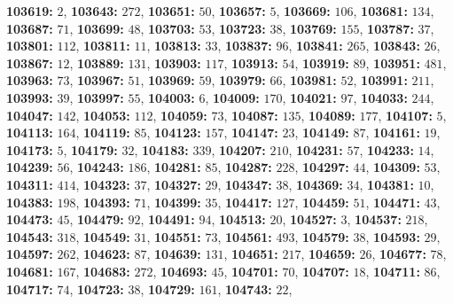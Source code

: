 \textsf{\bfseries 103619:} $2$, \textsf{\bfseries 103643:} $272$, \textsf{\bfseries 103651:} $50$, \textsf{\bfseries 103657:} $5$, \textsf{\bfseries 103669:} $106$, \textsf{\bfseries 103681:} $134$, \textsf{\bfseries 103687:} $71$, \textsf{\bfseries 103699:} $48$, \textsf{\bfseries 103703:} $53$, \textsf{\bfseries 103723:} $38$, \textsf{\bfseries 103769:} $155$, \textsf{\bfseries 103787:} $37$, \textsf{\bfseries 103801:} $112$, \textsf{\bfseries 103811:} $11$, \textsf{\bfseries 103813:} $33$, \textsf{\bfseries 103837:} $96$, \textsf{\bfseries 103841:} $265$, \textsf{\bfseries 103843:} $26$, \textsf{\bfseries 103867:} $12$, \textsf{\bfseries 103889:} $131$, \textsf{\bfseries 103903:} $117$, \textsf{\bfseries 103913:} $54$, \textsf{\bfseries 103919:} $89$, \textsf{\bfseries 103951:} $481$, \textsf{\bfseries 103963:} $73$, \textsf{\bfseries 103967:} $51$, \textsf{\bfseries 103969:} $59$, \textsf{\bfseries 103979:} $66$, \textsf{\bfseries 103981:} $52$, \textsf{\bfseries 103991:} $211$, \textsf{\bfseries 103993:} $39$, \textsf{\bfseries 103997:} $55$, \textsf{\bfseries 104003:} $6$, \textsf{\bfseries 104009:} $170$, \textsf{\bfseries 104021:} $97$, \textsf{\bfseries 104033:} $244$, \textsf{\bfseries 104047:} $142$, \textsf{\bfseries 104053:} $112$, \textsf{\bfseries 104059:} $73$, \textsf{\bfseries 104087:} $135$, \textsf{\bfseries 104089:} $177$, \textsf{\bfseries 104107:} $5$, \textsf{\bfseries 104113:} $164$, \textsf{\bfseries 104119:} $85$, \textsf{\bfseries 104123:} $157$, \textsf{\bfseries 104147:} $23$, \textsf{\bfseries 104149:} $87$, \textsf{\bfseries 104161:} $19$, \textsf{\bfseries 104173:} $5$, \textsf{\bfseries 104179:} $32$, \textsf{\bfseries 104183:} $339$, \textsf{\bfseries 104207:} $210$, \textsf{\bfseries 104231:} $57$, \textsf{\bfseries 104233:} $14$, \textsf{\bfseries 104239:} $56$, \textsf{\bfseries 104243:} $186$, \textsf{\bfseries 104281:} $85$, \textsf{\bfseries 104287:} $228$, \textsf{\bfseries 104297:} $44$, \textsf{\bfseries 104309:} $53$, \textsf{\bfseries 104311:} $414$, \textsf{\bfseries 104323:} $37$, \textsf{\bfseries 104327:} $29$, \textsf{\bfseries 104347:} $38$, \textsf{\bfseries 104369:} $34$, \textsf{\bfseries 104381:} $10$, \textsf{\bfseries 104383:} $198$, \textsf{\bfseries 104393:} $71$, \textsf{\bfseries 104399:} $35$, \textsf{\bfseries 104417:} $127$, \textsf{\bfseries 104459:} $51$, \textsf{\bfseries 104471:} $43$, \textsf{\bfseries 104473:} $45$, \textsf{\bfseries 104479:} $92$, \textsf{\bfseries 104491:} $94$, \textsf{\bfseries 104513:} $20$, \textsf{\bfseries 104527:} $3$, \textsf{\bfseries 104537:} $218$, \textsf{\bfseries 104543:} $318$, \textsf{\bfseries 104549:} $31$, \textsf{\bfseries 104551:} $73$, \textsf{\bfseries 104561:} $493$, \textsf{\bfseries 104579:} $38$, \textsf{\bfseries 104593:} $29$, \textsf{\bfseries 104597:} $262$, \textsf{\bfseries 104623:} $87$, \textsf{\bfseries 104639:} $131$, \textsf{\bfseries 104651:} $217$, \textsf{\bfseries 104659:} $26$, \textsf{\bfseries 104677:} $78$, \textsf{\bfseries 104681:} $167$, \textsf{\bfseries 104683:} $272$, \textsf{\bfseries 104693:} $45$, \textsf{\bfseries 104701:} $70$, \textsf{\bfseries 104707:} $18$, \textsf{\bfseries 104711:} $86$, \textsf{\bfseries 104717:} $74$, \textsf{\bfseries 104723:} $38$, \textsf{\bfseries 104729:} $161$, \textsf{\bfseries 104743:} $22$, 
